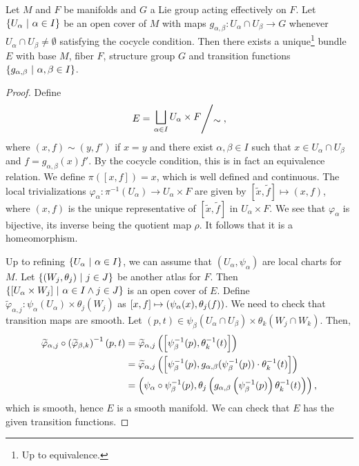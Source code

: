 \begin{izrek}
Let $M$ and $F$ be manifolds and $G$ a Lie group acting effectively
on $F$. Let $\left\{U_\alpha~\middle\vert~\alpha \in I\right\}$ be an open cover of $M$
with maps $g_{\alpha, \beta} \colon U_\alpha \cap U_\beta \to G$
whenever $U_\alpha \cap U_\beta \ne \emptyset$ satisfying the
cocycle condition. Then there exists a
unique\footnote{Up to equivalence.} bundle $E$ with base $M$, fiber
$F$, structure group $G$ and transition functions
$\left\{g_{\alpha, \beta}~\middle\vert~\alpha, \beta \in I\right\}$.
\end{izrek}

\begin{proof}
Define
\[
E =
\kvoc{\displaystyle \bigsqcup_{\alpha \in I} U_\alpha \times F}
{\sim},
\]
where $(x, f) \sim (y, f')$ if $x = y$ and there exist
$\alpha, \beta \in I$ such that $x \in U_\alpha \cap U_\beta$ and
$f = g_{\alpha, \beta}(x) f'$. By the cocycle condition, this is in
fact an equivalence relation. We define $\pi([x, f]) = x$, which is
well defined and continuous. The local trivializations
$\varphi_\alpha \colon \pi^{-1}(U_\alpha) \to U_\alpha \times F$
are given by
$\left[\widetilde{x}, \widetilde{f}\right] \mapsto (x,f)$, where
$(x,f)$ is the unique representative of
$\left[\widetilde{x}, \widetilde{f}\right]$ in $U_\alpha \times F$.
We see that $\varphi_\alpha$ is bijective, its inverse being the
quotient map $\rho$. It follows that it is a homeomorphism.

Up to refining $\left\{U_\alpha~\middle\vert~\alpha \in I\right\}$, we can assume that
$(U_\alpha, \psi_\alpha)$ are local charts for $M$. Let
$\left\{\left(W_j, \theta_j\right)~\middle\vert~j \in J\right\}$ be another atlas for $F$. Then
$\left\{[U_\alpha \times W_j]~\middle\vert~\alpha \in I \land j \in J\right\}$ is an
open cover of $E$. Define
$\widetilde{\varphi}_{\alpha, j} \colon
\psi_\alpha(U_\alpha) \times \theta_j(W_j)$ as
$[x, f] \mapsto \left(\psi_\alpha(x), \theta_j(f)\right)$. We need to check
that transition maps are smooth. Let
$(p,t) \in \psi_\beta(U_\alpha \cap U_\beta) \times
\theta_k(W_j \cap W_k)$. Then,
\begin{align*}
\widetilde{\varphi}_{\alpha, j} \circ
\left(\widetilde{\varphi}_{\beta, k}\right)^{-1} (p,t) &=
\widetilde{\varphi}_{\alpha, j}
\left(\left[\psi_\beta^{-1}(p), \theta_k^{-1}(t)\right]\right)
\\
&=
\widetilde{\varphi}_{\alpha, j}
\left(\left[\psi_\beta^{-1}(p),
g_{\alpha, \beta}(\psi_\beta^{-1}(p)) \cdot
\theta_k^{-1}(t)\right]\right)
\\
&=
\left(\psi_\alpha \circ \psi_\beta^{-1}(p),
\theta_j \left(g_{\alpha, \beta}
\left(\psi_\beta^{-1}(p)\right) \theta_k^{-1}(t)\right)\right),
\end{align*}
which is smooth, hence $E$ is a smooth manifold. We can check that
$E$ has the given transition functions.
\end{proof}

